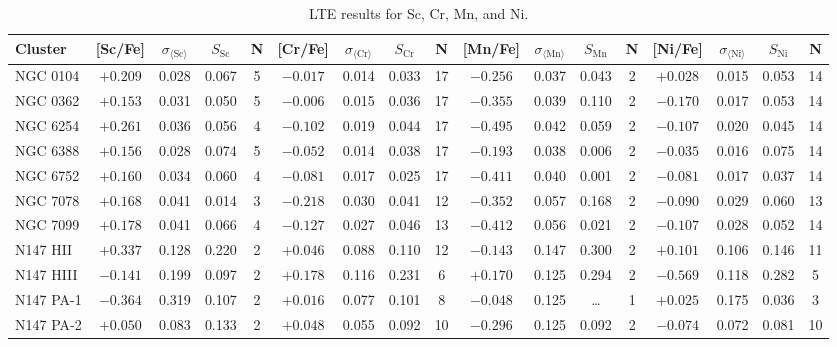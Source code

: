 \documentclass{aa}
\begin{document}
\begin{appendix}
\begin{table*}
\caption{LTE results for Sc, Cr, Mn, and Ni.}
\label{tab:results2v4lte}
\begin{adjustbox}{width=1\textwidth}
\centering
{\small
\begin{tabular}{l cccccccccccccccc}
\hline\hline
% 
Cluster       & [Sc/Fe] & $\sigma_{\langle\mathrm{Sc}\rangle}$ & $S_\mathrm{Sc}$ & N    & [Cr/Fe] & $\sigma_{\langle\mathrm{Cr}\rangle}$ & $S_\mathrm{Cr}$ & N     & [Mn/Fe] & $\sigma_{\langle\mathrm{Mn}\rangle}$ & $S_\mathrm{Mn}$ & N    & [Ni/Fe] & $\sigma_{\langle\mathrm{Ni}\rangle}$ & $S_\mathrm{Ni}$ & N    \\ \hline
NGC 0104      & $+0.209$ & 0.028 & 0.067 & 5 & $-0.017$ & 0.014 & 0.033 & 17 & $-0.256$ & 0.037 & 0.043 & 2 & $+0.028$ & 0.015 & 0.053 & 14 \\
NGC 0362      & $+0.153$ & 0.031 & 0.050 & 5 & $-0.006$ & 0.015 & 0.036 & 17 & $-0.355$ & 0.039 & 0.110 & 2 & $-0.170$ & 0.017 & 0.053 & 14 \\
NGC 6254      & $+0.261$ & 0.036 & 0.056 & 4 & $-0.102$ & 0.019 & 0.044 & 17 & $-0.495$ & 0.042 & 0.059 & 2 & $-0.107$ & 0.020 & 0.045 & 14 \\
NGC 6388      & $+0.156$ & 0.028 & 0.074 & 5 & $-0.052$ & 0.014 & 0.038 & 17 & $-0.193$ & 0.038 & 0.006 & 2 & $-0.035$ & 0.016 & 0.075 & 14 \\
NGC 6752      & $+0.160$ & 0.034 & 0.060 & 4 & $-0.081$ & 0.017 & 0.025 & 17 & $-0.411$ & 0.040 & 0.001 & 2 & $-0.081$ & 0.017 & 0.037 & 14 \\
NGC 7078      & $+0.168$ & 0.041 & 0.014 & 3 & $-0.218$ & 0.030 & 0.041 & 12 & $-0.352$ & 0.057 & 0.168 & 2 & $-0.090$ & 0.029 & 0.060 & 13 \\
NGC 7099      & $+0.178$ & 0.041 & 0.066 & 4 & $-0.127$ & 0.027 & 0.046 & 13 & $-0.412$ & 0.056 & 0.021 & 2 & $-0.107$ & 0.028 & 0.052 & 14 \\
N147 HII      & $+0.337$ & 0.128 & 0.220 & 2 & $+0.046$ & 0.088 & 0.110 & 12 & $-0.143$ & 0.147 & 0.300 & 2 & $+0.101$ & 0.106 & 0.146 & 11 \\
N147 HIII     & $-0.141$ & 0.199 & 0.097 & 2 & $+0.178$ & 0.116 & 0.231 & 6 & $+0.170$ & 0.125 & 0.294 & 2 & $-0.569$ & 0.118 & 0.282 & 5 \\
N147 PA-1     & $-0.364$ & 0.319 & 0.107 & 2 & $+0.016$ & 0.077 & 0.101 & 8 & $-0.048$ & 0.125 & \ldots & 1 & $+0.025$ & 0.175 & 0.036 & 3 \\
N147 PA-2     & $+0.050$ & 0.083 & 0.133 & 2 & $+0.048$ & 0.055 & 0.092 & 10 & $-0.296$ & 0.125 & 0.092 & 2 & $-0.074$ & 0.072 & 0.081 & 10 \\

\end{tabular}}
\end{adjustbox}
\end{table*}
\end{appendix}
\end{document}

